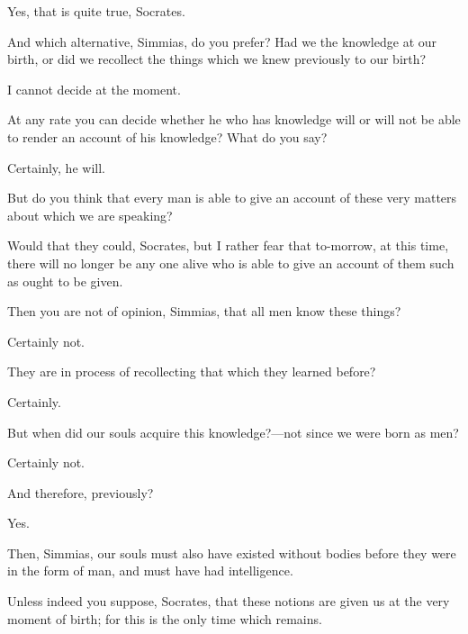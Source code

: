 \documentclass[11pt,letter]{article}
\begin{document}
\par  Yes, that is quite true, Socrates.

\par  And which alternative, Simmias, do you prefer? Had we the knowledge at our birth, or did we recollect the things which we knew previously to our birth?

\par  I cannot decide at the moment.

\par  At any rate you can decide whether he who has knowledge will or will not be able to render an account of his knowledge? What do you say?

\par  Certainly, he will.

\par  But do you think that every man is able to give an account of these very matters about which we are speaking?

\par  Would that they could, Socrates, but I rather fear that to-morrow, at this time, there will no longer be any one alive who is able to give an account of them such as ought to be given.

\par  Then you are not of opinion, Simmias, that all men know these things?

\par  Certainly not.

\par  They are in process of recollecting that which they learned before?

\par  Certainly.

\par  But when did our souls acquire this knowledge?—not since we were born as men?

\par  Certainly not.

\par  And therefore, previously?

\par  Yes.

\par  Then, Simmias, our souls must also have existed without bodies before they were in the form of man, and must have had intelligence.

\par  Unless indeed you suppose, Socrates, that these notions are given us at the very moment of birth; for this is the only time which remains.
\end{document}
